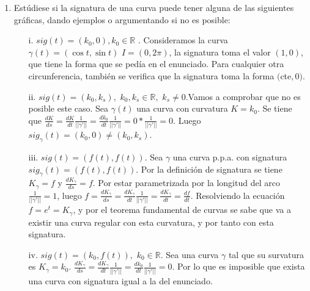 \documentclass[12pt,a4paper]{article}
\begin{document}
\begin{enumerate}
\item Estúdiese si la signatura de una curva puede tener alguna de las
  siguientes gráficas, dando ejemplos o argumentando si no es posible:
  \begin{enumerate}
  \item[i.]\textbf{$sig(t)=(k_{0},0), k_{0}\in \mathbb{R}$ }. Consideramos
    la curva $\gamma(t)=(\cos t, \sin t)$ $I=(0,2\pi)$, la signatura toma
    el valor $(1,0)$, que tiene la forma que se pedía en el enunciado. Para
    cualquier otra circunferencia, también se verifica que la signatura
    toma la forma $($cte$,0)$.
  \item[ii.]\textbf{$sig(t)=(k_{0}, k_{s}),\,\,
      k_{0},k_{s}\in\mathbb{R},\,\, k_{s}\ne0$}.Vamos
    a comprobar que no es posible este caso. Sea $\gamma(t)$ una curva con
    curvatura $K=k_{0}$. Se tiene que
    $\frac{dK}{ds} = \frac{dK}{dt} \frac{1}{||\gamma'||} =
    \frac{dk_{0}}{dt} \frac{1}{||\gamma'||} = 0 * \frac{1}{||\gamma'||} =
    0$. Luego $sig_{\gamma}(t) = (k_{0}, 0) \ne (k_{0}, k_{s})$.
  \item[iii.]\textbf{$sig(t)=(f(t),f(t))$}. Sea $\gamma$ una curva
    p.p.a. con signatura $sig_{\gamma}(t)=(f(t),f(t))$. Por la definición
    de signatura se tiene $K_{\gamma}=f$ y $\frac{dK_{\gamma}}{ds}=f$. Por
    estar parametrizada por la longitud del arco
    $\frac{1}{||\gamma'||} = 1$, luego
    $f = \frac{dK_{\gamma}}{ds} = \frac{dK_{\gamma}}{dt}
    \frac{1}{||\gamma'||} = \frac{dK_{\gamma}}{dt} = \frac{df}{dt}$.
    Resolviendo la ecuación $f=e^{t}=K_{\gamma}$, y por el teorema
    fundamental de curvas se sabe que va a existir una curva regular con
    esta curvatura, y por tanto con esta signatura.
  \item[iv.]\textbf{$sig(t)=(k_{0}, f(t)),\,\, k_{0}\in\mathbb{R}$}. Sea
    una curva $\gamma$ tal que su survatura es $K_{\gamma} = k_{0}$.
    $\frac{dK_{\gamma}}{ds} = \frac{dK_{\gamma}}{dt} \frac{1}{||\gamma'||}
    = \frac{dk_{0}}{dt} \frac{1}{||\gamma'||} = 0$.
    Por lo que es imposible que exista una curva con signatura igual a la
    del enunciado.
  \end{enumerate}


\end{enumerate}
\end{document}

